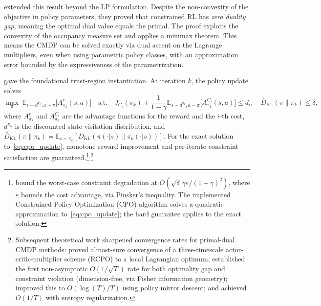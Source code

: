 \citet{Paternain2019} extended this result beyond the LP formulation.
Despite the non-convexity of the objective in policy parameters, they proved
that constrained RL has \emph{zero duality gap}, meaning the optimal dual value
equals the primal. The proof exploits the convexity of the occupancy measure
set and applies a minimax theorem. This means the CMDP can be solved
exactly via dual ascent on the Lagrange multipliers, even when using
parametric policy classes, with an approximation error bounded by the
expressiveness of the parametrization.

\citet{Achiam2017} gave the foundational trust-region instantiation.
At iteration $k$, the policy update solves
\begin{equation}
  \max_\pi \; \mathbb{E}_{s \sim d^{\pi_k}\!, a \sim \pi}
    \bigl[A^r_{\pi_k}(s,a)\bigr]
  \quad \text{s.t.} \quad
  J_{C_i}(\pi_k) + \frac{1}{1-\gamma}
    \mathbb{E}_{s \sim d^{\pi_k}\!, a \sim \pi}
    \bigl[A^{C_i}_{\pi_k}(s,a)\bigr] \leq d_i,
  \quad
  \bar{D}_{\mathrm{KL}}(\pi \| \pi_k) \leq \delta,
  \label{eq:cpo_update}
\end{equation}
where $A^r_{\pi_k}$ and $A^{C_i}_{\pi_k}$ are the advantage functions for
the reward and the $i$-th cost, $d^{\pi_k}$ is the discounted state
visitation distribution, and
$\bar{D}_{\mathrm{KL}}(\pi\|\pi_k)
= \mathbb{E}_{s \sim \pi_k}[D_{\mathrm{KL}}(\pi(\cdot|s)\|\pi_k(\cdot|s))]$.
For the exact solution to~\eqref{eq:cpo_update}, monotone reward improvement
and per-iterate constraint satisfaction are
guaranteed.\footnote{\citet{Achiam2017} bound the worst-case constraint
degradation at
$O(\sqrt{\delta}\,\gamma\varepsilon/(1-\gamma)^2)$, where $\varepsilon$
bounds the cost advantage, via Pinsker's inequality. The implemented
Constrained Policy Optimization (CPO) algorithm solves a quadratic
approximation to~\eqref{eq:cpo_update}; the hard guarantee applies to the
exact solution.}\textsuperscript{,}\footnote{Subsequent theoretical work
sharpened convergence rates for primal-dual CMDP methods:
\citet{Tessler2019} proved almost-sure convergence of a three-timescale
actor-critic-multiplier scheme (RCPO) to a local Lagrangian optimum;
\citet{Ding2020} established the first non-asymptotic
$O(1/\sqrt{T})$ rate for both optimality gap and constraint violation
(dimension-free, via Fisher information geometry);
\citet{Liu2022cmdp} improved this to $O(\log(T)/T)$ using policy mirror
descent; and \citet{Ying2022} achieved $O(1/T)$ with entropy
regularization.}

